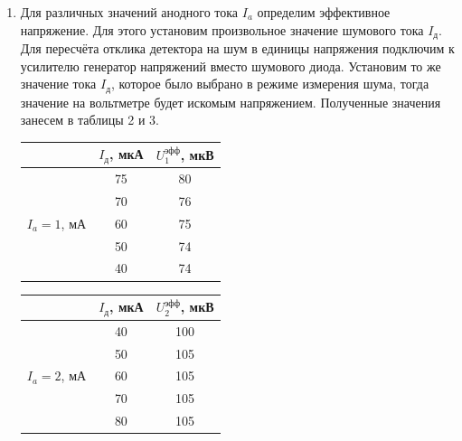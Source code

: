 \documentclass[a4paper, 12pt]{article}%
\begin{document}
\begin{enumerate}
	\item Для различных значений анодного тока $I_a$ определим эффективное напряжение. Для этого установим произвольное значение шумового тока $I_{\text{д}}$. Для пересчёта отклика детектора на шум в единицы напряжения подключим к усилителю генератор напряжений вместо шумового диода. Установим то же значение тока $I_{\text{д}}$, которое было выбрано в режиме измерения шума, тогда значение на вольтметре будет искомым напряжением. Полученные значения занесем в таблицы 2 и 3.
	
	\begin{table}[H]
	\begin{center}
	\begin{tabular} {|c|c|c|}
		\hline
		& $I_{\text{д}}$, мкА & $U^{\text{эфф}}_1$, мкВ \\ \hline
		\multirow{5}{*}{$I_a = 1$, мА} & 75 & 80 \\ \cline{2-3}
		& 70 & 76 \\ \cline{2-3}
		& 60 & 75 \\ \cline{2-3}
		& 50 & 74 \\ \cline{2-3}
		& 40 & 74 \\ \hline
	\end{tabular}
	\begin{tabular} {|c|c|c|}
		\hline
		& $I_{\text{д}}$, мкА & $U^{\text{эфф}}_2$, мкВ \\ \hline
		\multirow{5}{*}{$I_a = 2$, мА} & 40 & 100 \\ \cline{2-3}
		& 50 & 105 \\ \cline{2-3}
		& 60 & 105 \\ \cline{2-3}
		& 70 & 105 \\ \cline{2-3}
		& 80 & 105 \\ \hline
	\end{tabular}


\end{center}
\end{table}
\end{enumerate}
\end{document}
